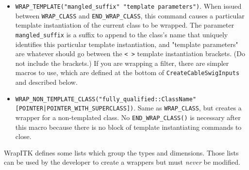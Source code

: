 \documentclass{InsightArticle}
\begin{document}
\begin{itemize}
  \item \verb$WRAP_TEMPLATE("mangled_suffix" "template parameters")$. When issued between \verb$WRAP_CLASS$
and \verb$END_WRAP_CLASS$, this command causes a particular template instantiation of
the current class to be wrapped. The parameter \verb$mangled_suffix$ is a suffix to
append to the class's name that uniquely identifies this particular template
instantiation, and "template parameters" are whatever should go between the \verb$< >$
template instantiation brackets. (Do not include the brackets.) If you are
wrapping a filter, there are simpler macros to use, which are defined at the
bottom of \verb$CreateCableSwigInputs$ and described below.

  \item \verb$WRAP_NON_TEMPLATE_CLASS("fully_qualified::ClassName" [POINTER|POINTER_WITH_SUPERCLASS])$.
Same as \verb$WRAP_CLASS$, but creates a wrapper
for a non-templated class. No \verb$END_WRAP_CLASS()$ is necessary after this macro
because there is no block of template instantiating commands to close.

\end{itemize}

WrapITK defines some lists which group the types and dimensions. Those lists can be used
by the developer to create a wrappers but must {\em never} be modified.
\end{document}
